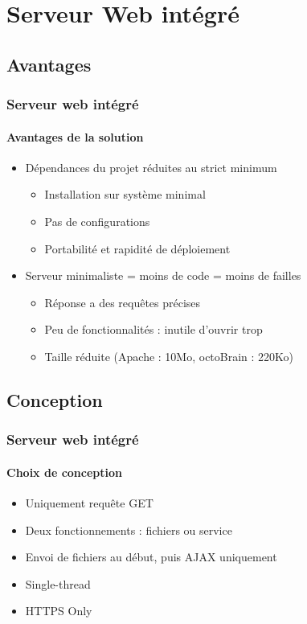 \section{Serveur Web intégré}

\subsection{Avantages}
\begin{frame}
	\frametitle{Serveur web intégré}
	\framesubtitle{Avantages de la solution}
	\begin{itemize}
		\item Dépendances du projet réduites au strict minimum
			\begin{itemize}
				\item Installation sur système minimal
				\item Pas de configurations
				\item Portabilité et rapidité de déploiement
			\end{itemize}
		\item Serveur minimaliste = moins de code = moins de failles
			\begin{itemize}
				\item Réponse a des requêtes précises
				\item Peu de fonctionnalités : inutile d'ouvrir trop
				\item Taille réduite (Apache : 10Mo, octoBrain : 220Ko)
			\end{itemize}
	\end{itemize}
\end{frame}

\subsection{Conception}
\begin{frame}
	\frametitle{Serveur web intégré}
	\framesubtitle{Choix de conception}
	\begin{itemize}
		\item Uniquement requête GET
		\item Deux fonctionnements : fichiers ou service
		\item Envoi de fichiers au début, puis AJAX uniquement
		\item Single-thread
		\item HTTPS Only
	\end{itemize}
\end{frame}

